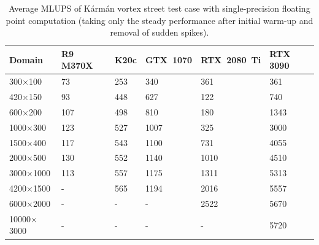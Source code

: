 \begin{table}[!ht]
	\centering
	\begin{tabular}{ |p{1.9cm}||p{1.6cm}|p{0.9cm}|p{1.5cm}|p{1.7cm}|p{1.5cm}|  }
		\hline
		Domain & R9 M370X & K20c & GTX~1070 & RTX~2080~Ti & RTX 3090 \\
		\hline
		300$\times$100   & 73 & 253 & 340 & 361    & 361  \\
		420$\times$150   & 93 & 448 & 627 & 122    & 740  \\
		600$\times$200   & 107 & 498 & 810 & 180    & 1343  \\
		1000$\times$300   & 123 & 527 & 1007 & 325    & 3000  \\
		1500$\times$400   & 117 & 543 & 1100 & 731    & 4055  \\
		2000$\times$500   & 130 & 552 & 1140 & 1010    & 4510  \\
		3000$\times$1000   & 113 & 557 & 1175 & 1311    & 5313  \\
		4200$\times$1500   & - & 565 & 1194 & 2016    & 5557  \\
		6000$\times$2000   & - & - & - & 2522  & 5670  \\
		10000$\times$3000   & - & - & - & -   & 5720  \\
		\hline
	\end{tabular}
	\caption{Average MLUPS of Kármán vortex street test case with single-precision floating point computation (taking only the steady performance after initial warm-up and removal of sudden spikes).}
	\label{tab:channel-mlups}
\end{table}


